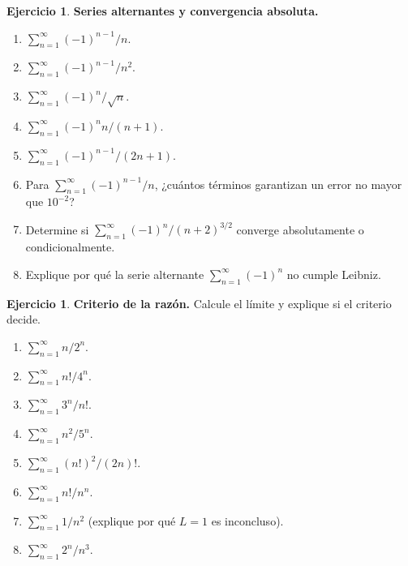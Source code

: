\documentclass[12pt]{article}
\theoremstyle{definition}
\newtheorem{Ejer}[teorema]{Ejercicio}
\theoremstyle{remark}
\begin{document}
\begin{Ejer}\textbf{Series alternantes y convergencia absoluta.}
\begin{enumerate}[resume=banco4]
\item $\displaystyle\sum_{n=1}^\infty (-1)^{n-1}/n$.
\item $\displaystyle\sum_{n=1}^\infty (-1)^{n-1}/n^2$.
\item $\displaystyle\sum_{n=1}^\infty (-1)^n/\sqrt n$.
\item $\displaystyle\sum_{n=1}^\infty (-1)^n n/(n+1)$.
\item $\displaystyle\sum_{n=1}^\infty (-1)^{n-1}/(2n+1)$.
\item Para $\sum_{n=1}^\infty(-1)^{n-1}/n$, ¿cuántos términos garantizan un error no mayor que $10^{-2}$?
\item Determine si $\sum_{n=1}^\infty(-1)^n/(n+2)^{3/2}$ converge absolutamente o condicionalmente.
\item Explique por qué la serie alternante $\sum_{n=1}^\infty(-1)^n$ no cumple Leibniz.
\end{enumerate}
\end{Ejer}

\begin{Ejer}\textbf{Criterio de la razón.} Calcule el límite y explique si el criterio decide.
\begin{enumerate}[resume=banco4]
\item $\displaystyle\sum_{n=1}^\infty n/2^n$.
\item $\displaystyle\sum_{n=1}^\infty n!/4^n$.
\item $\displaystyle\sum_{n=1}^\infty 3^n/n!$.
\item $\displaystyle\sum_{n=1}^\infty n^2/5^n$.
\item $\displaystyle\sum_{n=1}^\infty (n!)^2/(2n)!$.
\item $\displaystyle\sum_{n=1}^\infty n!/n^n$.
\item $\displaystyle\sum_{n=1}^\infty 1/n^2$ (explique por qué $L=1$ es inconcluso).
\item $\displaystyle\sum_{n=1}^\infty 2^n/n^3$.
\end{enumerate}
\end{Ejer}
\end{document}
